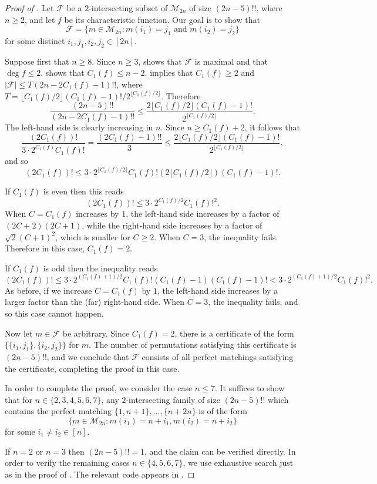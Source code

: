 \documentclass[10pt,a4paper]{amsart}
\theoremstyle{definition}
\providecommand{\cM}{\mathcal{M}}
\begin{document}
\begin{proof}[Proof of ]
Let $\mathcal{F}$ be a $2$-intersecting subset of $\cM_{2n}$ of size $(2n-5)!!$, where $n \geq 2$, and let $f$ be its characteristic function. Our goal is to show that
\[
 \mathcal{F} = \{ m \in \cM_{2n} : m(i_1) = j_1 \text{ and } m(i_2) = j_2 \}
\]
for some distinct $i_1,j_1,i_2,j_2 \in [2n]$.

Suppose first that $n \geq 8$. Since $n \geq 3$,  shows that $\mathcal{F}$ is maximal and that $\deg f \leq 2$.  shows that $C_1(f) \leq n-2$.  implies that $C_1(f) \geq 2$ and  $|\mathcal{F}| \leq T (2n - 2C_1(f) - 1)!!$, where $T = \lfloor C_1(f)/2 \rfloor (C_1(f) - 1)!/2^{\lfloor C_1(f)/2 \rfloor}$. Therefore
\[
 \frac{(2n-5)!!}{(2n - 2C_1(f) - 1)!!} \leq \frac{2\lfloor C_1(f)/2 \rfloor (C_1(f) - 1)!}{2^{\lfloor C_1(f)/2 \rfloor}}.
\]
The left-hand side is clearly increasing in $n$. Since $n \geq C_1(f) + 2$, it follows that
\[
 \frac{(2C_1(f))!}{3 \cdot 2^{C_1(f)} C_1(f)!} =
 \frac{(2C_1(f) - 1)!!}{3} \leq \frac{2\lfloor C_1(f)/2 \rfloor (C_1(f) - 1)!}{2^{\lfloor C_1(f)/2 \rfloor}},
\]
and so 
\[
 (2C_1(f))! \leq 3 \cdot 2^{\lceil C_1(f)/2 \rceil} C_1(f)! (2\lfloor C_1(f)/2 \rfloor) (C_1(f) - 1)!.
\]

If $C_1(f)$ is even then this reads
\[
 (2C_1(f))! \leq 3 \cdot 2^{C_1(f)/2} C_1(f)!^2.
\]
When $C = C_1(f)$ increases by $1$, the left-hand side increases by a factor of $(2C+2)(2C+1)$, while the right-hand side increases by a factor of $\sqrt{2} (C+1)^2$, which is smaller for $C \geq 2$. When $C = 3$, the inequality fails. Therefore in this case, $C_1(f) = 2$.

If $C_1(f)$ is odd then the inequality reads
\[
 (2C_1(f))! \leq 3 \cdot 2^{(C_1(f)+1)/2} C_1(f)! (C_1(f) - 1)(C_1(f) - 1)! < 3 \cdot 2^{(C_1(f)+1)/2} C_1(f)!^2.
\]
As before, if we increase $C = C_1(f)$ by $1$, the left-hand side increases by a larger factor than the (far) right-hand side. When $C = 3$, the inequality fails, and so this case cannot happen.

Now let $m \in \mathcal{F}$ be arbitrary. Since $C_1(f) = 2$, there is a certificate of the form $\bigl\{\{i_1,j_1\},\{i_2,j_2\}\bigr\}$ for $m$. The number of permutations satisfying this certificate is $(2n-5)!!$, and we conclude that $\mathcal{F}$ consists of all perfect matchings satisfying the certificate, completing the proof in this case.

\smallskip

In order to complete the proof, we consider the case $n \leq 7$. It suffices to show that for $n \in \{2,3,4,5,6,7\}$, any $2$-intersecting family of size $(2n-5)!!$ which contains the perfect matching $\{1,n+1\},\ldots,\{n+2n\}$ is of the form
\[
 \{ m \in \cM_{2n} : m(i_1) = n + i_1, m(i_2) = n + i_2 \}
\]
for some $i_1 \neq i_2 \in [n]$.

If $n = 2$ or $n = 3$ then $(2n-5)!! = 1$, and the claim can be verified directly. In order to verify the remaining cases $n \in \{4,5,6,7\}$, we use exhaustive search just as in the proof of . The relevant code appears in .
\end{proof}
\end{document}
